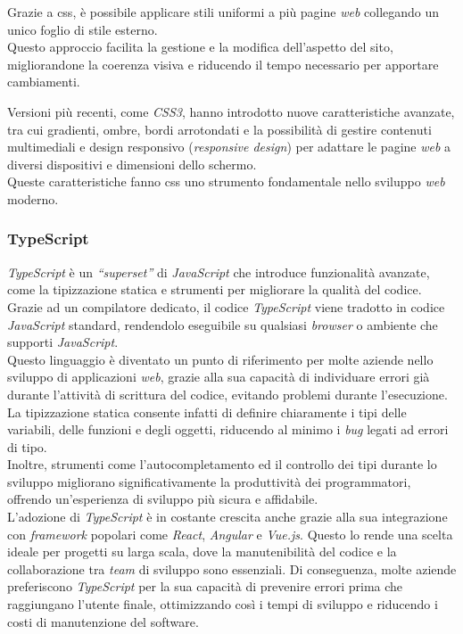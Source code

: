 \noindent Grazie a \gls{css}, è possibile applicare stili uniformi a più pagine \textit{web} collegando un unico foglio di stile esterno.\\
Questo approccio facilita la gestione e la modifica dell’aspetto del sito, migliorandone la coerenza visiva e riducendo il tempo necessario per apportare cambiamenti.

\noindent Versioni più recenti, come \textit{CSS3}, hanno introdotto nuove caratteristiche avanzate, tra cui gradienti, ombre, bordi arrotondati e la possibilità di gestire contenuti multimediali
 e design responsivo (\textit{responsive design}) per adattare le pagine \textit{web} a diversi dispositivi e dimensioni dello schermo. \\
Queste caratteristiche fanno \gls{css} uno strumento fondamentale nello sviluppo \textit{web} moderno.

\pagebreak
\subsubsection{TypeScript}

\textit{TypeScript} è un \textit{“superset”} di \textit{JavaScript} che introduce funzionalità avanzate, come la tipizzazione statica e strumenti per migliorare la qualità del codice.\\
Grazie ad un compilatore dedicato, il codice \textit{TypeScript} viene tradotto in codice \textit{JavaScript} standard, rendendolo eseguibile su qualsiasi \textit{browser} o ambiente che supporti \textit{JavaScript}.\\

\noindent Questo linguaggio è diventato un punto di riferimento per molte aziende nello sviluppo di applicazioni \textit{web}, grazie alla sua capacità di individuare errori già durante l'attività di scrittura del codice, evitando problemi durante l'esecuzione. 
La tipizzazione statica consente infatti di definire chiaramente i tipi delle variabili, delle funzioni e degli oggetti, riducendo al minimo i \textit{bug} legati ad errori di tipo. \\
Inoltre, strumenti come l’autocompletamento ed il controllo dei tipi durante lo sviluppo migliorano significativamente la produttività dei programmatori, offrendo un’esperienza di sviluppo più sicura e affidabile.\\

\noindent L’adozione di \textit{TypeScript} è in costante crescita anche grazie alla sua integrazione con \textit{framework} popolari come \textit{React}, \textit{Angular} e \textit{Vue.js}. 
Questo lo rende una scelta ideale per progetti su larga scala, dove la manutenibilità del codice e la collaborazione tra \textit{team} di sviluppo sono essenziali.
Di conseguenza, molte aziende preferiscono \textit{TypeScript} per la sua capacità di prevenire errori prima che raggiungano l'utente finale, ottimizzando così i tempi di sviluppo e riducendo i costi di manutenzione del software.\\

